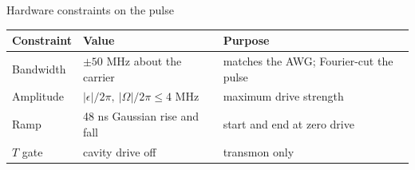 \begin{frame}{Hardware constraints on the pulse}
  \vspace{0.6em}
  \begin{center}
  \small
  \renewcommand{\arraystretch}{1.5}
  \begin{tabular}{@{}l l l@{}}
    \textbf{Constraint} & \textbf{Value} & \textbf{Purpose} \\
    \hline
    Bandwidth & $\pm 50$ MHz about the carrier & matches the AWG; Fourier-cut the pulse \\
    Amplitude & $|\epsilon|/2\pi,\ |\Omega|/2\pi \le 4$ MHz & maximum drive strength \\
    Ramp      & 48 ns Gaussian rise and fall & start and end at zero drive \\
    $T$ gate  & cavity drive off & transmon only \\
    \hline
  \end{tabular}
  \end{center}


\end{frame}
